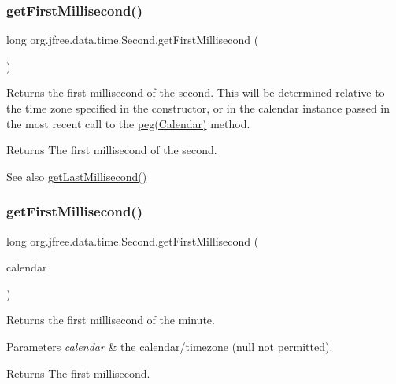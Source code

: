 \subsubsection{\texorpdfstring{get\+First\+Millisecond()}{getFirstMillisecond()}\hspace{0.1cm}{\footnotesize\ttfamily [1/2]}}
{\footnotesize\ttfamily long org.\+jfree.\+data.\+time.\+Second.\+get\+First\+Millisecond (\begin{DoxyParamCaption}{ }\end{DoxyParamCaption})}

Returns the first millisecond of the second. This will be determined relative to the time zone specified in the constructor, or in the calendar instance passed in the most recent call to the \mbox{\hyperlink{classorg_1_1jfree_1_1data_1_1time_1_1_second_a417846010aa3a4fd29e215dfcc0690a9}{peg(\+Calendar)}} method.

\begin{DoxyReturn}{Returns}
The first millisecond of the second.
\end{DoxyReturn}
\begin{DoxySeeAlso}{See also}
\mbox{\hyperlink{classorg_1_1jfree_1_1data_1_1time_1_1_second_af026da0a956634a29ae3070dc955576e}{get\+Last\+Millisecond()}} 
\end{DoxySeeAlso}
\mbox{\label{classorg_1_1jfree_1_1data_1_1time_1_1_second_a033a094744db4b5b941bd1a5c47f2b38}} 
\subsubsection{\texorpdfstring{get\+First\+Millisecond()}{getFirstMillisecond()}\hspace{0.1cm}{\footnotesize\ttfamily [2/2]}}
{\footnotesize\ttfamily long org.\+jfree.\+data.\+time.\+Second.\+get\+First\+Millisecond (\begin{DoxyParamCaption}\item[{Calendar}]{calendar }\end{DoxyParamCaption})}

Returns the first millisecond of the minute.


\begin{DoxyParams}{Parameters}
{\em calendar} & the calendar/timezone ({\ttfamily null} not permitted).\\
\hline
\end{DoxyParams}
\begin{DoxyReturn}{Returns}
The first millisecond.
\end{DoxyReturn}

